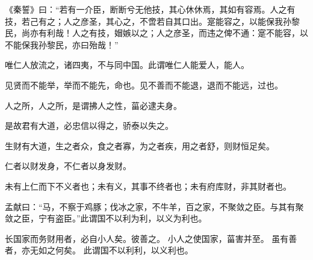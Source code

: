 \documentclass[twoside,openany]{book}
\begin{document}
\begin{pinyinscope}
《秦誓》曰：“若有一介臣，断断兮无他技，其心休休焉，其如有容焉。人之有技，若己有之；人之彦圣，其心之，不啻若自其口出。寔能容之，以能保我孙黎民，尚亦有利哉！人之有技，媢嫉以之；人之彦圣，而违之俾不通：寔不能容，以不能保我孙黎民，亦曰殆哉！”

唯仁人放流之，诸四夷，不与同中国。此谓唯仁人能爱人，能人。

见贤而不能举，举而不能先，命也。见不善而不能退，退而不能远，过也。

人之所，人之所，是谓拂人之性，菑必逮夫身。

是故君有大道，必忠信以得之，骄泰以失之。

生财有大道，生之者众，食之者寡，为之者疾，用之者舒，则财恒足矣。

仁者以财发身，不仁者以身发财。

未有上仁而下不义者也；未有义，其事不终者也；未有府库财，非其财者也。

孟献曰：“马，不察于鸡豚；伐冰之家，不牛羊，百之家，不聚敛之臣。与其有聚敛之臣，宁有盗臣。”此谓国不以利为利，以义为利也。

长国家而务财用者，必自小人矣。彼善之。
小人之使国家，菑害并至。
虽有善者，亦无如之何矣。
此谓国不以利利，以义利也。
\end{pinyinscope}
\end{document}
